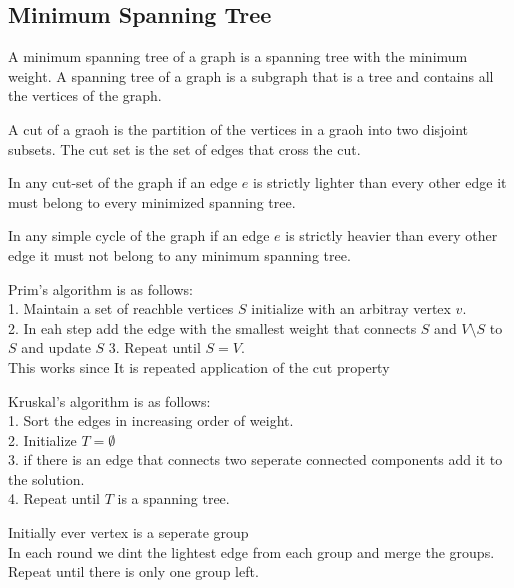 \documentclass[answers,12pt,addpoints]{exam}
\begin{document}
\begin{questions}
\section{Minimum Spanning Tree}
\begin{definition}[MST]
    A minimum spanning tree of a graph is a spanning tree with the minimum weight.
    A spanning tree of a graph is a subgraph that is a tree and contains all the vertices of the graph.
\end{definition}
\begin{definition}
    A cut of a graoh is the partition of the vertices in a graoh into two disjoint subsets. The cut set is the set of edges that cross the cut.
\end{definition}
\begin{theorem}
    In any cut-set of the graph if an edge $e$ is strictly lighter than every other edge it must belong to every minimized spanning tree.
\end{theorem}
\begin{definition}
    In any simple cycle of the graph if an edge $e$ is strictly heavier than every other edge it must not belong to any minimum spanning tree.
\end{definition}
\begin{definition}
    Prim's algorithm is as follows:\\
    1. Maintain a set of reachble vertices $S$ initialize with an arbitray vertex $v$.\\
    2. In eah step add the edge with the smallest weight that connects $S$ and $V \setminus S$ to $S$ and update $S$ 
    3. Repeat until $S = V$.\\
    This works since It is repeated application of the cut property
\end{definition}
\begin{definition}
    Kruskal's algorithm is as follows:\\
    1. Sort the edges in increasing order of weight.\\
    2. Initialize $T = \emptyset$\\
    3. if there is an edge that connects two seperate connected components add it to the solution.\\
    4. Repeat until $T$ is a spanning tree.
\end{definition}
\begin{definition}
    Initially ever vertex is a seperate group\\
    In each round we dint the lightest edge from each group and merge the groups.\\
    Repeat until there is only one group left.
\end{definition}

\end{questions}
\end{document}
